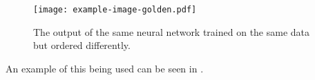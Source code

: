\begin{figure}[htbp]
	\centering
	\texttt{[image: example-image-golden.pdf]}
	\caption{The output of the same neural network trained on the same data but ordered differently.}
	\label{fig:ann-order}
\end{figure}

An example of this being used can be seen in \citeauthor{bengio2009}.

